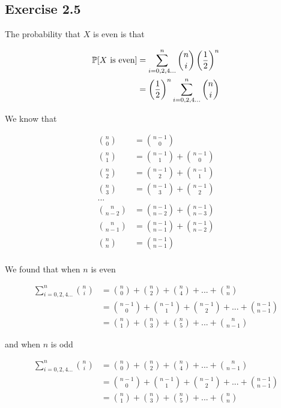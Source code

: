 \subsection*{Exercise 2.5}

The probability that $X$ is even is that

\begin{equation*}
\begin{split}
\P[X \text{ is even}] & = \sum_{i=0,2,4...}^{n} \binom{n}{i}\left(\frac{1}{2}\right)^{n} \\
& = \left(\frac{1}{2}\right)^{n} \sum_{i=0,2,4...}^{n} \binom{n}{i}
\end{split}
\end{equation*}

We know that

\begin{equation*}
\begin{split}
\binom{n}{0} & = \binom{n-1}{0} \\
\binom{n}{1} & = \binom{n-1}{1} + \binom{n-1}{0} \\
\binom{n}{2} & = \binom{n-1}{2} + \binom{n-1}{1} \\
\binom{n}{3} & = \binom{n-1}{3} + \binom{n-1}{2} \\
... \\
\binom{n}{n-2} & = \binom{n-1}{n-2} + \binom{n-1}{n-3} \\
\binom{n}{n-1} & = \binom{n-1}{n-1} + \binom{n-1}{n-2} \\
\binom{n}{n} & = \binom{n-1}{n-1} \\
\end{split}
\end{equation*}

We found that when $n$ is even

\begin{equation*}
\begin{split}
\sum_{i=0,2,4...}^{n} \binom{n}{i} & = \binom{n}{0} + \binom{n}{2} + \binom{n}{4} + ... + \binom{n}{n} \\
& = \binom{n-1}{0} + \binom{n-1}{1} + \binom{n-1}{2} + ... + \binom{n-1}{n-1} \\
& = \binom{n}{1} + \binom{n}{3} + \binom{n}{5} + ... + \binom{n}{n - 1}
\end{split}
\end{equation*}

and when $n$ is odd

\begin{equation*}
\begin{split}
\sum_{i=0,2,4...}^{n} \binom{n}{i} & = \binom{n}{0} + \binom{n}{2} + \binom{n}{4} + ... + \binom{n}{n-1} \\
& = \binom{n-1}{0} + \binom{n-1}{1} + \binom{n-1}{2} + ... + \binom{n-1}{n-1} \\
& = \binom{n}{1} + \binom{n}{3} + \binom{n}{5} + ... + \binom{n}{n}
\end{split}
\end{equation*}

